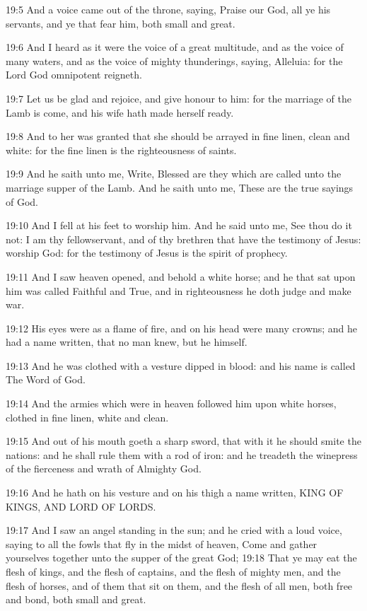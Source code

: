 19:5 And a voice came out of the throne, saying, Praise our God, all ye his servants, and ye that fear him, both small and great.

19:6 And I heard as it were the voice of a great multitude, and as the voice of many waters, and as the voice of mighty thunderings, saying, Alleluia: for the Lord God omnipotent reigneth.

19:7 Let us be glad and rejoice, and give honour to him: for the marriage of the Lamb is come, and his wife hath made herself ready.

19:8 And to her was granted that she should be arrayed in fine linen, clean and white: for the fine linen is the righteousness of saints.

19:9 And he saith unto me, Write, Blessed are they which are called unto the marriage supper of the Lamb. And he saith unto me, These are the true sayings of God.

19:10 And I fell at his feet to worship him. And he said unto me, See thou do it not: I am thy fellowservant, and of thy brethren that have the testimony of Jesus: worship God: for the testimony of Jesus is the spirit of prophecy.

19:11 And I saw heaven opened, and behold a white horse; and he that sat upon him was called Faithful and True, and in righteousness he doth judge and make war.

19:12 His eyes were as a flame of fire, and on his head were many crowns; and he had a name written, that no man knew, but he himself.

19:13 And he was clothed with a vesture dipped in blood: and his name is called The Word of God.

19:14 And the armies which were in heaven followed him upon white horses, clothed in fine linen, white and clean.

19:15 And out of his mouth goeth a sharp sword, that with it he should smite the nations: and he shall rule them with a rod of iron: and he treadeth the winepress of the fierceness and wrath of Almighty God.

19:16 And he hath on his vesture and on his thigh a name written, KING OF KINGS, AND LORD OF LORDS.

19:17 And I saw an angel standing in the sun; and he cried with a loud voice, saying to all the fowls that fly in the midst of heaven, Come and gather yourselves together unto the supper of the great God; 19:18 That ye may eat the flesh of kings, and the flesh of captains, and the flesh of mighty men, and the flesh of horses, and of them that sit on them, and the flesh of all men, both free and bond, both small and great.

